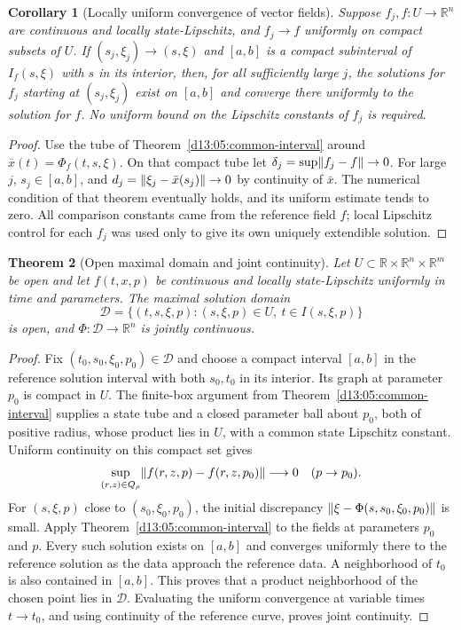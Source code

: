 \documentclass[11pt,oneside]{book}
\newtheorem{theorem}{Theorem}[chapter]
\newtheorem{corollary}[theorem]{Corollary}
\theoremstyle{definition}
\theoremstyle{remark}\newtheorem{remark}[theorem]{Remark}
\newcommand{\R}{\mathbb R}\newcommand{\C}{\mathbb C}
\begin{document}
\begin{corollary}[Locally uniform convergence of vector fields]\label{d13:05:field-convergence}
Suppose $f_j,f:U\to\R^n$ are continuous and locally state-Lipschitz,
and $f_j\to f$ uniformly on compact subsets of $U$. If
$(s_j,\xi_j)\to(s,\xi)$ and $[a,b]$ is a compact subinterval of
$I_f(s,\xi)$ with $s$ in its interior, then, for all sufficiently
large $j$, the solutions for $f_j$ starting at $(s_j,\xi_j)$ exist
on $[a,b]$ and converge there uniformly to the solution for $f$.
No uniform bound on the Lipschitz constants of $f_j$ is required.
\end{corollary}
\begin{proof}
Use the tube of Theorem~\ref{d13:05:common-interval} around
$\bar x(t)=\Phi_f(t,s,\xi)$. On that compact tube let
$\delta_j=\sup\lVert f_j-f\rVert\to0$. For large $j$, $s_j\in[a,b]$,
and $d_j=\lVert\xi_j-\bar x(s_j)\rVert\to0$ by continuity of
$\bar x$. The numerical condition of that theorem eventually holds,
and its uniform estimate tends to zero. All comparison constants came
from the reference field $f$; local Lipschitz control for each $f_j$
was used only to give its own uniquely extendible solution.
\end{proof}

\begin{theorem}[Open maximal domain and joint continuity]\label{d13:05:openness}
Let $U\subset\R\times\R^n\times\R^m$ be open and let
$f(t,x,p)$ be continuous and locally state-Lipschitz uniformly in
time and parameters. The maximal solution domain
\[
 \mathcal D=\{(t,s,\xi,p):(s,\xi,p)\in U,
                   \ t\in I(s,\xi,p)\}
\]
is open, and $\Phi:\mathcal D\to\R^n$ is jointly continuous.
\end{theorem}
\begin{proof}
Fix $(t_0,s_0,\xi_0,p_0)\in\mathcal D$ and choose a compact
interval $[a,b]$ in the reference solution interval with both
$s_0,t_0$ in its interior. Its graph at parameter $p_0$ is compact
in $U$. The finite-box argument from
Theorem~\ref{d13:05:common-interval} supplies a state tube and a
closed parameter ball about $p_0$, both of positive radius, whose
product lies in $U$, with a common state Lipschitz constant.
Uniform continuity on this compact set gives
\[
 \sup_{(r,z)\in Q_\rho}
       \lVert f(r,z,p)-f(r,z,p_0)\rVert\longrightarrow0
       \quad(p\to p_0).
\]
For $(s,\xi,p)$ close to $(s_0,\xi_0,p_0)$, the initial discrepancy
$\lVert\xi-\Phi(s,s_0,\xi_0,p_0)\rVert$ is small. Apply
Theorem~\ref{d13:05:common-interval} to the fields at parameters
$p_0$ and $p$. Every such solution exists on $[a,b]$ and converges
uniformly there to the reference solution as the data approach the
reference data. A neighborhood of $t_0$ is also contained in $[a,b]$.
This proves that a product neighborhood of the chosen point lies in
$\mathcal D$. Evaluating the uniform convergence at variable times
$t\to t_0$, and using continuity of the reference curve, proves joint
continuity.
\end{proof}
\end{document}
